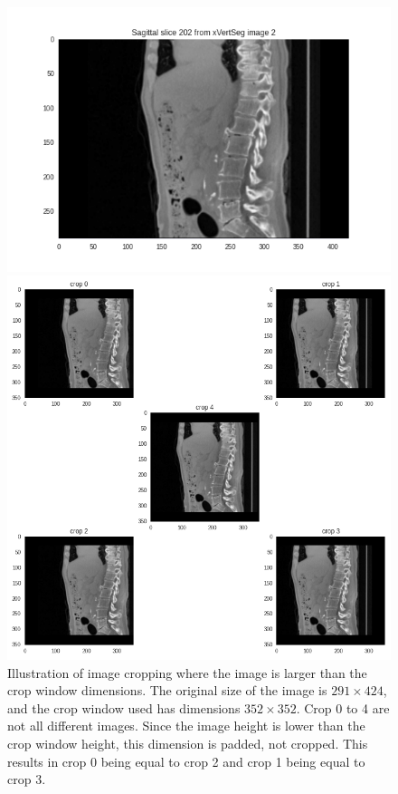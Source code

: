\begin{figure}
    \centering
    \begin{minipage}{.99\textwidth}
        \includegraphics[width=.99\textwidth]{images/slice202.png}
    \end{minipage} 
    \begin{minipage}{0.99\textwidth}
        \includegraphics[width=.99\textwidth]{images/cropping_slice202.png}
    \end{minipage}
    \caption{
        Illustration of image cropping where the image is larger than the crop window dimensions.
        The original size of the image is $291 \times 424$, and the crop window used has dimensions $352 \times 352$.
        Crop 0 to 4 are not all different images. Since the image height is lower than the crop window height, this dimension is padded, not cropped.
        This results in crop 0 being equal to crop 2 and crop 1 being equal to crop 3. \label{fig:smallcrop}
        }
    
\end{figure}